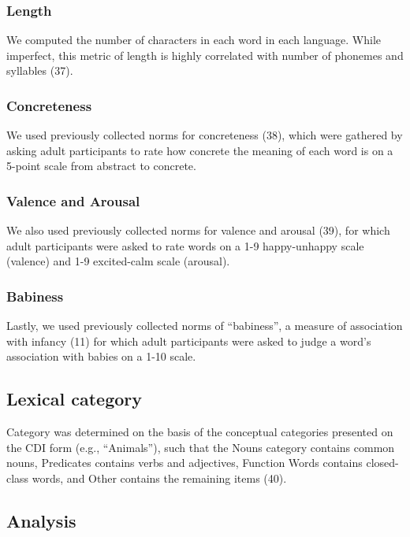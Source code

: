 \documentclass[english,man]{apa6}
\theoremstyle{definition}
\theoremstyle{definition}
\theoremstyle{definition}
\theoremstyle{remark}
\begin{document}
\subsubsection{Length}\label{length}

We computed the number of characters in each word in each language.
While imperfect, this metric of length is highly correlated with number
of phonemes and syllables (37).

\subsubsection{Concreteness}\label{concreteness}

We used previously collected norms for concreteness (38), which were
gathered by asking adult participants to rate how concrete the meaning
of each word is on a 5-point scale from abstract to concrete.

\subsubsection{Valence and Arousal}\label{valence-and-arousal}

We also used previously collected norms for valence and arousal (39),
for which adult participants were asked to rate words on a 1-9
happy-unhappy scale (valence) and 1-9 excited-calm scale (arousal).

\subsubsection{Babiness}\label{babiness}

Lastly, we used previously collected norms of \enquote{babiness}, a
measure of association with infancy (11) for which adult participants
were asked to judge a word's association with babies on a 1-10 scale.

\subsection{Lexical category}\label{lexical-category}

Category was determined on the basis of the conceptual categories
presented on the CDI form (e.g., \enquote{Animals}), such that the Nouns
category contains common nouns, Predicates contains verbs and
adjectives, Function Words contains closed-class words, and Other
contains the remaining items (40).

\subsection{Analysis}\label{analysis}
\end{document}
